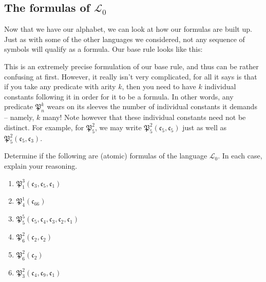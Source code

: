 \subsection{The formulas of $\mathcal{L}_0$}


Now that we have our alphabet, we can look at how our formulas are built up. Just as with some of the other languages we considered, not any sequence of symbols will qualify as a formula. Our base rule looks like this:


This is an extremely precise formulation of our base rule, and thus can be rather confusing at first. However, it really isn't very complicated, for all it says is that if you take any predicate with arity $k$, then you need to have $k$ individual constants following it in order for it to be a formula. In other words, any predicate $\mathfrak{P}^k_n$ wears on its sleeves the number of individual constants it demands -- namely, $k$ many! Note however that these individual constants need not be distinct. For example, for $\mathfrak{P}^2_5$, we may write $\mathfrak{P}^2_5(\mathfrak{c}_5, \mathfrak{c}_5)$ just as well as $\mathfrak{P}^2_5(\mathfrak{c}_5, \mathfrak{c}_3)$. 

\begin{exc}
Determine if the following are (atomic) formulas of the language $\mathcal{L}_0$. In each case, explain your reasoning. 

\begin{enumerate}
	\item $\mathfrak{P}^3_1(\mathfrak{c}_3, \mathfrak{c}_5, \mathfrak{c}_1)$
	\item $\mathfrak{P}^1_4(\mathfrak{c}_{66})$
	\item $\mathfrak{P}^5_5(\mathfrak{c}_5, \mathfrak{c}_4, \mathfrak{c}_3, \mathfrak{c}_2, \mathfrak{c}_1)$
	\item $\mathfrak{P}^2_6(\mathfrak{c}_2, \mathfrak{c}_2)$
	\item $\mathfrak{P}^2_6(\mathfrak{c}_2)$
	\item $\mathfrak{P}^2_3(\mathfrak{c}_4, \mathfrak{c}_9, \mathfrak{c}_1)$
\end{enumerate}
\end{exc}

